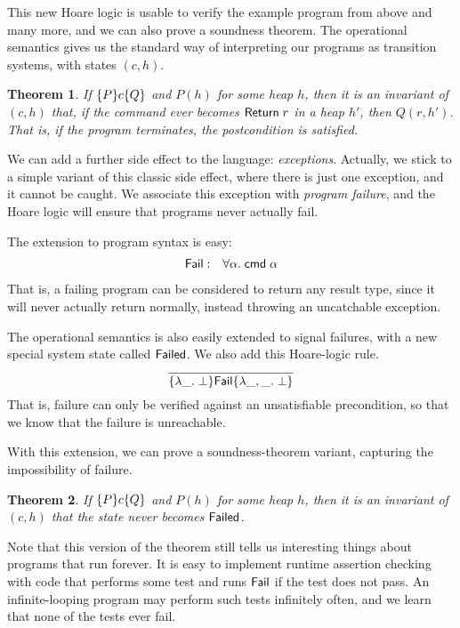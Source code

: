 \documentclass{amsbook}
\newtheorem{theorem}{Theorem}[chapter]
\theoremstyle{definition}
\theoremstyle{remark}
\numberwithin{section}{chapter}
\numberwithin{equation}{chapter}
\begin{document}
This new Hoare logic is usable to verify the example program from above and many more, and we can also prove a soundness theorem.
The operational semantics gives us the standard way of interpreting our programs as transition systems, with states $(c, h)$.

\invariants
\begin{theorem}
  If $\{P\} c \{Q\}$ and $P(h)$ for some heap $h$, then it is an invariant of $(c, h)$ that, if the command ever becomes $\mathsf{Return} \; r$ in a heap $h'$, then $Q(r, h')$.  That is, if the program terminates, the postcondition is satisfied.
\end{theorem}

We can add a further side effect to the language: \emph{exceptions}.
Actually, we stick to a simple variant of this classic side effect, where there is just one exception, and it cannot be caught.
We associate this exception with \emph{program failure}, and the Hoare logic will ensure that programs never actually fail.

The extension to program syntax is easy:
\begin{eqnarray*}
  \mathsf{Fail} &:& \forall \alpha. \; \mathsf{cmd} \; \alpha
\end{eqnarray*}
That is, a failing program can be considered to return any result type, since it will never actually return normally, instead throwing an uncatchable exception.

The operational semantics is also easily extended to signal failures, with a new special system state called $\mathsf{Failed}$.
We also add this Hoare-logic rule.
$$\infer{\hoare{\lambda \_. \; \bot}{\mt{Fail}}{\lambda \_, \_. \; \bot}}{}$$
That is, failure can only be verified against an unsatisfiable precondition, so that we know that the failure is unreachable.

With this extension, we can prove a soundness-theorem variant, capturing the impossibility of failure.

\invariants
\begin{theorem}
  If $\{P\} c \{Q\}$ and $P(h)$ for some heap $h$, then it is an invariant of $(c, h)$ that the state never becomes $\mathsf{Failed}$.
\end{theorem}

Note that this version of the theorem still tells us interesting things about programs that run forever.
It is easy to implement runtime assertion checking with code that performs some test and runs $\mathsf{Fail}$ if the test does not pass.
An infinite-looping program may perform such tests infinitely often, and we learn that none of the tests ever fail.
\end{document}
